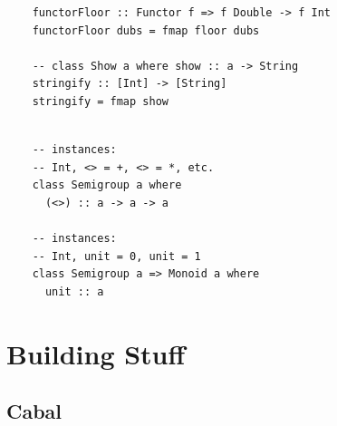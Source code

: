 \documentclass[tikz]{beamer}
\theoremstyle{definition}
\begin{document}
\begin{frame}[fragile]
\begin{center}
	\begin{verbatim}
	functorFloor :: Functor f => f Double -> f Int
	functorFloor dubs = fmap floor dubs
	
	-- class Show a where show :: a -> String
	stringify :: [Int] -> [String]
	stringify = fmap show
	\end{verbatim}
\end{center}
\end{frame}

\begin{frame}[fragile]
\begin{center}
	\begin{verbatim}
	
	-- instances: 
	-- Int, <> = +, <> = *, etc.
	class Semigroup a where 
	  (<>) :: a -> a -> a
	  
	-- instances: 
	-- Int, unit = 0, unit = 1
	class Semigroup a => Monoid a where 
	  unit :: a
	\end{verbatim}
\end{center}
\end{frame}


\section{Building Stuff}
\subsection{Cabal}


\end{document}
